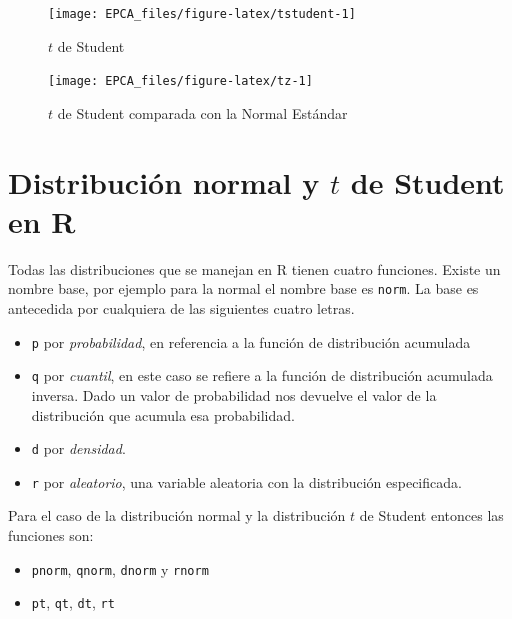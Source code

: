 \documentclass[
]{krantz}
\providecommand{\tightlist}{%
  \setlength{\itemsep}{0pt}\setlength{\parskip}{0pt}}
\begin{document}
\begin{figure}[h!]

{\centering \texttt{[image: EPCA\_files/figure-latex/tstudent-1]} 

}

\caption{$t$ de Student}\label{fig:tstudent}
\end{figure}

\begin{figure}[h!]

{\centering \texttt{[image: EPCA\_files/figure-latex/tz-1]} 

}

\caption{$t$ de Student comparada con la Normal Estándar}\label{fig:tz}
\end{figure}

\hypertarget{distribucion-normal-y-t-de-student-en-r}{%
\section{\texorpdfstring{Distribución normal y \(t\) de Student en R}{Distribución normal y t de Student en R}}\label{distribucion-normal-y-t-de-student-en-r}}

Todas las distribuciones que se manejan en R tienen cuatro funciones. Existe un nombre base, por ejemplo para la normal el nombre base es \texttt{norm}. La base es antecedida por cualquiera de las siguientes cuatro letras.

\begin{itemize}
\tightlist
\item
  \texttt{p} por \emph{probabilidad}, en referencia a la función de distribución acumulada
\item
  \texttt{q} por \emph{cuantil}, en este caso se refiere a la función de distribución acumulada inversa. Dado un valor de probabilidad nos devuelve el valor de la distribución que acumula esa probabilidad.
\item
  \texttt{d} por \emph{densidad}.
\item
  \texttt{r} por \emph{aleatorio}, una variable aleatoria con la distribución especificada.
\end{itemize}

Para el caso de la distribución normal y la distribución \(t\) de Student entonces las funciones son:

\begin{itemize}
\tightlist
\item
  \texttt{pnorm}, \texttt{qnorm}, \texttt{dnorm} y \texttt{rnorm}
\item
  \texttt{pt}, \texttt{qt}, \texttt{dt}, \texttt{rt}
\end{itemize}
\end{document}
